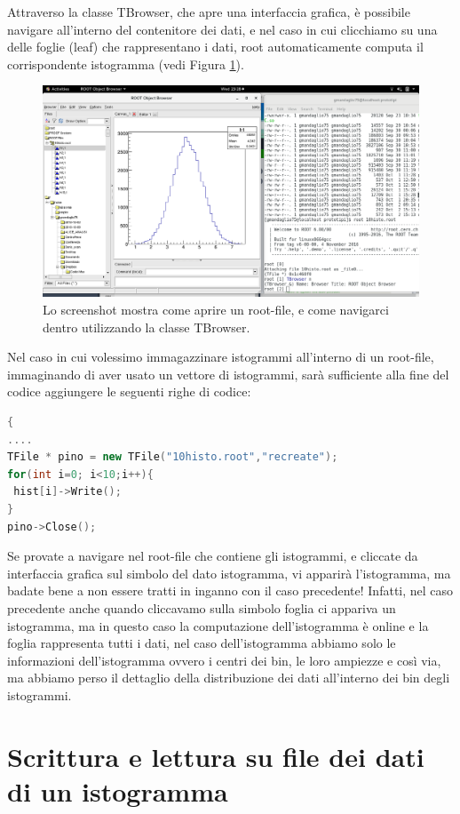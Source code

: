 \documentclass[11pt,fleqn]{book} %
\begin{document}
Attraverso la classe TBrowser, che apre una interfaccia grafica, è possibile navigare all'interno del contenitore dei dati,
e nel caso in cui clicchiamo su una delle foglie (leaf) che rappresentano i dati, root automaticamente computa il corrispondente istogramma (vedi Figura \ref{screen2n}).

\begin{figure}
\centering
\includegraphics[scale=0.25]{Pictures/screen2n.png}
\caption{Lo screenshot mostra come aprire un root-file, e come navigarci dentro utilizzando la classe TBrowser. \label{screen2n}}
\end{figure}

Nel caso in cui volessimo immagazzinare istogrammi all'interno di un root-file, immaginando di aver usato un vettore di istogrammi, sarà sufficiente alla fine del codice aggiungere le seguenti righe di codice:
\begin{lstlisting}[language=c++]
{
....
TFile * pino = new TFile("10histo.root","recreate");
for(int i=0; i<10;i++){
 hist[i]->Write();
}
pino->Close();
\end{lstlisting}

Se provate a navigare nel root-file che contiene gli istogrammi, e cliccate da interfaccia grafica sul simbolo del dato istogramma,
vi apparirà l'istogramma, ma badate bene a non essere tratti in inganno con il caso precedente! Infatti, nel caso precedente anche quando cliccavamo sulla simbolo foglia ci appariva un istogramma, ma in questo caso la computazione dell'istogramma è online e la foglia rappresenta tutti i dati, nel caso dell'istogramma abbiamo solo le informazioni dell'istogramma ovvero i centri dei bin, le loro ampiezze e così via, ma abbiamo perso il dettaglio della distribuzione dei dati all'interno dei bin degli istogrammi.


\section{Scrittura e lettura su file dei dati di un istogramma}
\end{document}
